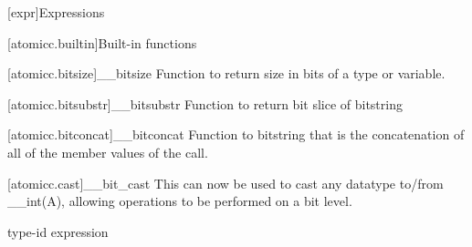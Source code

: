[expr]{Expressions}


[atomicc.builtin]{Built-in functions}

[atomicc.bitsize]{__bitsize}
Function to return size in bits of a type or variable.

[atomicc.bitsubstr]{__bitsubstr}
Function to return bit slice of bitstring

[atomicc.bitconcat]{__bitconcat}
Function to bitstring that is the concatenation of all of the member values of the call.

[atomicc.cast]{__bit_cast}
This can now be used to cast any datatype to/from __int(A), allowing operations to be performed on a bit level.

\begin{bnf}
\br
      type-id \terminal{> (} expression \terminal{)}
\end{bnf}
